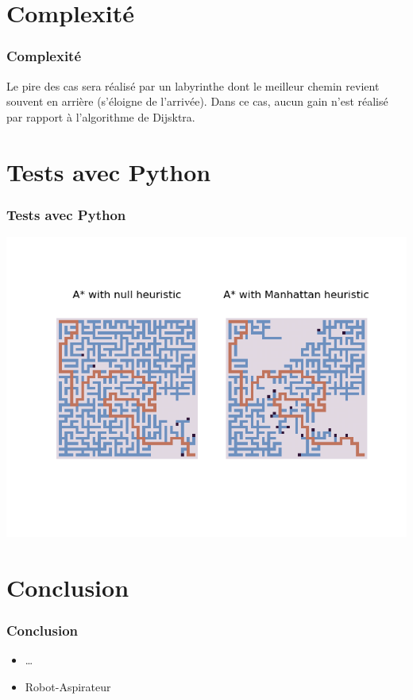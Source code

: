 \documentclass{beamer}
\begin{document}
\section{Complexité}
\begin{frame}
  \frametitle{Complexité}
  Le pire des cas sera réalisé par un labyrinthe dont le meilleur chemin revient
  souvent en arrière (s'éloigne de l'arrivée). Dans ce cas, aucun gain n'est
  réalisé par rapport à l'algorithme de Dijsktra.
\end{frame}

\section{Tests avec Python}
\begin{frame}
  \frametitle{Tests avec Python}
  \includegraphics[width=.9\linewidth]{manhattan_vs_null.png}
\end{frame}

\section{Conclusion}
\begin{frame}
  \frametitle{Conclusion}
  \begin{itemize}
  \item \ldots
  \item Robot-Aspirateur
  \end{itemize}
\end{frame}
\end{document}
